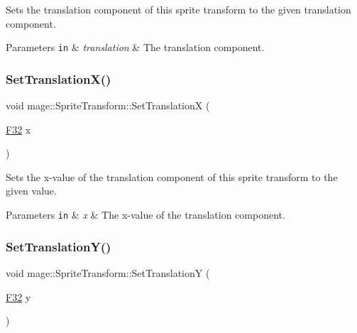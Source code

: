 Sets the translation component of this sprite transform to the given translation component.


\begin{DoxyParams}[1]{Parameters}
\mbox{\tt in}  & {\em translation} & The translation component. \\
\hline
\end{DoxyParams}
\mbox{\label{classmage_1_1_sprite_transform_aa30ede51f36c31b5a35ebe7b60545e1c}} 
\subsubsection{\texorpdfstring{Set\+Translation\+X()}{SetTranslationX()}}
{\footnotesize\ttfamily void mage\+::\+Sprite\+Transform\+::\+Set\+TranslationX (\begin{DoxyParamCaption}\item[{\mbox{\hyperlink{namespacemage_aa97e833b45f06d60a0a9c4fc22ae02c0}{F32}}}]{x }\end{DoxyParamCaption})\hspace{0.3cm}{\ttfamily [noexcept]}}

Sets the x-\/value of the translation component of this sprite transform to the given value.


\begin{DoxyParams}[1]{Parameters}
\mbox{\tt in}  & {\em x} & The x-\/value of the translation component. \\
\hline
\end{DoxyParams}
\mbox{\label{classmage_1_1_sprite_transform_a3086df30d1ed6813db07bc78ef47df6c}} 
\subsubsection{\texorpdfstring{Set\+Translation\+Y()}{SetTranslationY()}}
{\footnotesize\ttfamily void mage\+::\+Sprite\+Transform\+::\+Set\+TranslationY (\begin{DoxyParamCaption}\item[{\mbox{\hyperlink{namespacemage_aa97e833b45f06d60a0a9c4fc22ae02c0}{F32}}}]{y }\end{DoxyParamCaption})\hspace{0.3cm}{\ttfamily [noexcept]}}

